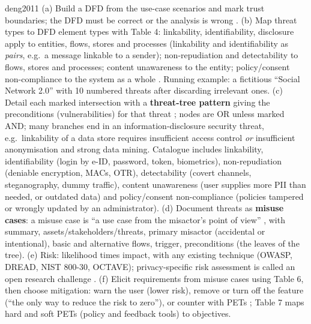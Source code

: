 \begin{papercard}{deng2011}
 (a) Build a DFD from the use-case scenarios and mark trust boundaries; the DFD must be correct or the analysis is wrong . (b) Map threat types to DFD element types with Table 4: linkability, identifiability, disclosure apply to entities, flows, stores and processes (linkability and identifiability as \emph{pairs}, e.g.\ a message linkable to a sender); non-repudiation and detectability to flows, stores and processes; content unawareness to the entity; policy/consent non-compliance to the system as a whole . Running example: a fictitious ``Social Network 2.0'' with 10 numbered threats after discarding irrelevant ones. (c) Detail each marked intersection with a \textbf{threat-tree pattern} giving the preconditions (vulnerabilities) for that threat ; nodes are OR unless marked AND; many branches end in an information-disclosure security threat, e.g.\ linkability of a data store requires insufficient access control \emph{or} insufficient anonymisation and strong data mining. Catalogue includes linkability, identifiability (login by e-ID, password, token, biometrics), non-repudiation (deniable encryption, MACs, OTR), detectability (covert channels, steganography, dummy traffic), content unawareness (user supplies more PII than needed, or outdated data) and policy/consent non-compliance (policies tampered or wrongly updated by an administrator). (d) Document threats as \textbf{misuse cases}: a misuse case is ``a use case from the misactor's point of view'' , with summary, assets/stakeholders/threats, primary misactor (accidental or intentional), basic and alternative flows, trigger, preconditions (the leaves of the tree). (e) Risk: likelihood times impact, with any existing technique (OWASP, DREAD, NIST 800-30, OCTAVE); privacy-specific risk assessment is called an open research challenge . (f) Elicit requirements from misuse cases using Table 6, then choose mitigation: warn the user (lower risk), remove or turn off the feature (``the only way to reduce the risk to zero''), or counter with PETs ; Table 7 maps hard and soft PETs (policy and feedback tools) to objectives.


\end{papercard}
